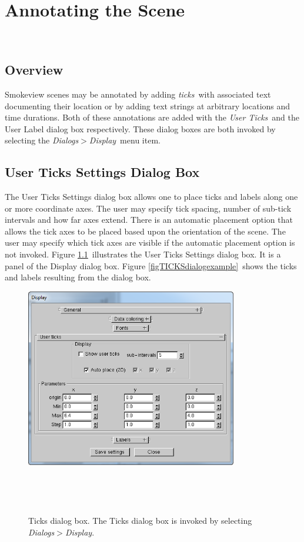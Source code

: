 \documentclass[11pt,twoside]{book}
\begin{document}
\chapter{Annotating the Scene }
\label{section:annotate}\ \label{subsect_features}
\section{Overview}
Smokeview scenes may be annotated by adding {\em ticks}\ with associated
text documenting their location
or by adding text strings at arbitrary locations and time durations.
Both of these annotations
are added with the {\em User Ticks}\ and the User Label dialog
box respectively.  These dialog boxes are both invoked by selecting the
{\em Dialogs$>$Display}\ menu item.

\section{User Ticks Settings Dialog Box}
The User Ticks Settings dialog box allows one to place
ticks and labels along one or more coordinate axes. The
user may specify tick spacing, number of sub-tick intervals and
how far axes extend.  There is an automatic placement option that
allows the tick axes to be placed based upon the orientation of
the scene.  The user may specify which tick axes are visible if
the automatic placement option is not invoked.  Figure
\ref{figTICKSdialog}\ illustrates the User Ticks Settings
dialog box.  It is a panel of the Display dialog box.
Figure \ref{figTICKSdialogexample}\ shows the ticks and labels
resulting from the dialog box.

\begin{figure}[bph]
\centerline{
\includegraphics[width=3.631944in]{FIGURES/figTICKS}
}\ \caption[Ticks dialog box.]{Ticks dialog box. The
Ticks dialog box is invoked by selecting {\em
Dialogs$>$Display}. }\ \label{figTICKSdialog}
\end{figure}
\end{document}
